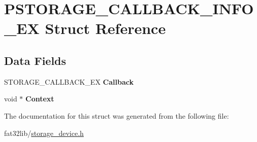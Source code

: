 \hypertarget{struct_s_t_o_r_a_g_e___c_a_l_l_b_a_c_k___i_n_f_o___e_x}{\section{P\-S\-T\-O\-R\-A\-G\-E\-\_\-\-C\-A\-L\-L\-B\-A\-C\-K\-\_\-\-I\-N\-F\-O\-\_\-\-E\-X Struct Reference}
\label{struct_s_t_o_r_a_g_e___c_a_l_l_b_a_c_k___i_n_f_o___e_x}
}
\subsection*{Data Fields}
\begin{DoxyCompactItemize}
\item 
\hypertarget{struct_s_t_o_r_a_g_e___c_a_l_l_b_a_c_k___i_n_f_o___e_x_a00c3aa361e2f2822dae7c4bca555e93a}{S\-T\-O\-R\-A\-G\-E\-\_\-\-C\-A\-L\-L\-B\-A\-C\-K\-\_\-\-E\-X {\bfseries Callback}}\label{struct_s_t_o_r_a_g_e___c_a_l_l_b_a_c_k___i_n_f_o___e_x_a00c3aa361e2f2822dae7c4bca555e93a}

\item 
\hypertarget{struct_s_t_o_r_a_g_e___c_a_l_l_b_a_c_k___i_n_f_o___e_x_a57500455085d52fbc17139d096a40b8a}{void $\ast$ {\bfseries Context}}\label{struct_s_t_o_r_a_g_e___c_a_l_l_b_a_c_k___i_n_f_o___e_x_a57500455085d52fbc17139d096a40b8a}

\end{DoxyCompactItemize}


The documentation for this struct was generated from the following file\-:\begin{DoxyCompactItemize}
\item 
fat32lib/\hyperlink{storage__device_8h}{storage\-\_\-device.\-h}\end{DoxyCompactItemize}
